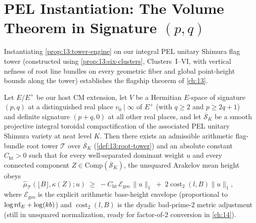 \section{PEL Instantiation: The Volume Theorem in Signature $(p, q)$}
\label{sec:13:volume-pq}

Instantiating \cref{prop:13:tower-engine} on our integral PEL unitary Shimura flag tower (constructed using \cref{prop:13:six-clusters}, Clusters~I--VI, with vertical nefness of root line bundles on every geometric fiber and global point-height bounds along the tower) establishes the flagship theorem of \cref{ch:13}.

\begin{theorem}
\label{thm:13:volume-pq}
Let $E/E^+$ be our host CM extension, let $V$ be a Hermitian $E$-space of signature $(p, q)$ at a distinguished real place $v_0 \mid \infty$ of $E^+$ (with $q \ge 2$ and $p \ge 2q + 1$) and definite signature $(p+q, 0)$ at all other real places, and let $\overline{\mathcal{S}}_K$ be a smooth projective integral toroidal compactification of the associated PEL unitary Shimura variety at neat level $K$. Then there exists an admissible arithmetic flag-bundle root tower $\mathcal{T}$ over $\overline{\mathcal{S}}_K$ (\cref{def:13:root-tower}) and an absolute constant $C_{\mathrm{ht}} > 0$ such that for every well-separated dominant weight $u$ and every connected component $Z \in \mathrm{Comp}(\overline{\mathcal{S}}_K)$, the unsquared Arakelov mean height obeys
\begin{equation}
\label{eq:13:vol-pq}
  \widehat{\mu}_{\mathcal{T}}(\lfloor B \rfloor, \kappa(Z); u)
  \;\ge\; -C_{\mathrm{ht}}\,\mathcal{E}_{\mathrm{geo}}\,\|u\|_1 \;+\; 2\operatorname{cost}_2(l, B)\|u\|_1,
\end{equation}
where $\mathcal{E}_{\mathrm{geo}}$ is the explicit arithmetic base-height envelope (proportional to $\log\mathrm{rd}_E + \log(k b)$) and $\operatorname{cost}_2(l, B)$ is the dyadic bad-prime-$2$ metric adjustment (still in unsquared normalization, ready for factor-of-$2$ conversion in \cref{ch:14}).
\end{theorem}

